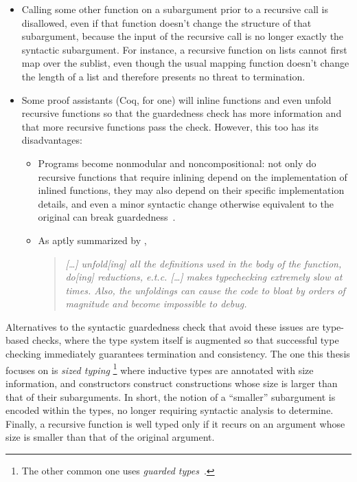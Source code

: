 \begin{itemize}
  \item Calling some other function on a subargument prior to a recursive call is disallowed,
    even if that function doesn't change the structure of that subargument,
    because the input of the recursive call is no longer exactly the syntactic subargument.
    For instance, a recursive function on lists cannot first map over the sublist,
    even though the usual mapping function doesn't change the length of a list
    and therefore presents no threat to termination.
  \item Some proof assistants (Coq, for one) will inline functions and even unfold recursive functions
    so that the guardedness check has more information
    and that more recursive functions pass the check.
    However, this too has its disadvantages:
    \begin{itemize}
      \item Programs become nonmodular and noncompositional:
        not only do recursive functions that require inlining
        depend on the implementation of inlined functions,
        they may also depend on their specific implementation details,
        and even a minor syntactic change otherwise equivalent to the original
        can break guardedness~\citep{CIC-hat-minus}.
      \item As aptly summarized by \citet{coqterm},
        \begin{quote}
        \begin{singlespace}
        \textit{{\rm [\ldots]} unfold{\rm [ing]} all the definitions used in the body of the function, do{\rm [ing]} reductions, e.t.c.
        {\rm [\ldots]} makes typechecking extremely slow at times.
        Also, the unfoldings can cause the code to bloat by orders of magnitude and become impossible to debug.}
        \end{singlespace}
        \end{quote}
    \end{itemize}
\end{itemize}

Alternatives to the syntactic guardedness check that avoid these issues are type-based checks,
where the type system itself is augmented so that successful type checking
immediately guarantees termination and consistency.
The one this thesis focuses on is \emph{sized typing}\punctstack{,}%
\footnote{The other common one uses \emph{guarded types}~\citep{guarded-types}.}
where inductive types are annotated with size information,
and constructors construct constructions whose size is larger than that of their subarguments.
In short, the notion of a ``smaller'' subargument is encoded within the types,
no longer requiring syntactic analysis to determine.
Finally, a recursive function is well typed only if it recurs on an argument
whose size is smaller than that of the original argument.

